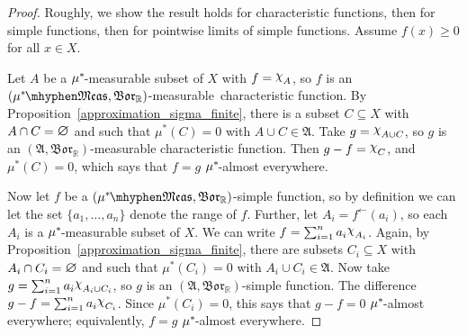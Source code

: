 \documentclass[
twoside=true,
paper=letter,
fontsize=9pt,
pagesize=auto,
leqno,
openany,
headsepline,
overfullrule,
]{scrbook}
\theoremstyle{plain}
\theoremstyle{plain}
\theoremstyle{definition}
\theoremstyle{bfnoteitalic}
\theoremstyle{bfnoteroman}
\newcommand{\sigalg}[1]{\mathfrak{#1}}
\newcommand{\borel}{\mathfrak{Bor}}
\newcommand{\charfunction}[1]{{\raisebox{2pt}{$\chi$}}_{#1}}
\newcommand{\mtset}{\hbox{\large{$\varnothing$}}}
\newcommand{\preimage}[1]{#1^{\leftarrow}}
\newcommand{\R}{\mathbb{R}}
\newcommand{\meets}{\cap}
\newcommand{\sigmaalgebra}{\sigalg{A}}
\newcommand{\measurable}[1]{{#1}\mhyphen\mathfrak{Meas}}
\newcommand{\kernast}{\ast\kern-1pt}
\newcommand{\mbmeasurable}{$(\measurable{\measure^\kernast},\borel_\R)$\hyp{}measurable}
\newcommand{\measurespace}{X}
\newcommand{\measure}{\mu}
\begin{document}
\begin{proof}
Roughly, we show the result holds for characteristic functions, then for simple functions, then for pointwise limits of simple functions. 
Assume $f(x)\geq 0$ for all $x\in\measurespace$.

Let $A$ be a  $\measure^\kernast$-measurable subset of $\measurespace$ with  $f=\charfunction{A}$, so $f$ is an \mbmeasurable\ characteristic function. By Proposition~\ref{approximation_sigma_finite}, there is a subset $C\subseteq\measurespace$ with $A\meets C =\mtset$ and  such that $\measure^*(C) = 0$ with $A\cup C\in \sigmaalgebra$.  
Take $g=\charfunction{A\cup C}$, so $g$ is an $(\sigmaalgebra,\borel_\R)$\hyp{}measurable characteristic function. Then $g-f = \charfunction{C}$, and $\measure^*(C) = 0$, which says that $f=g$ $\measure^\kernast$-almost everywhere.

Now let $f$ be a $(\measurable{\measure^\kernast},\borel_\R)$-simple function, so by definition we can let the set $\{a_1,\ldots, a_n\}$ denote the range of $f$. Further, let $A_i = \preimage{f}(a_i)$, so each $A_i$ is a $\measure^\kernast$-measurable subset of $\measurespace$. We can write $f=\sum_{i=1}^n a_i\charfunction{A_i}$.
Again, by Proposition~\ref{approximation_sigma_finite}, there are subsets $C_i\subseteq\measurespace$ with $A_i\meets C_i =\mtset$ and  such that $\measure^*(C_i) = 0$ with $A_i\cup C_i\in \sigmaalgebra$.  
Now take $g=\sum_{i=1}^n a_i\charfunction{A_i\cup C_i}$, so $g$ is an $(\sigmaalgebra,\borel_\R)$-simple function. The difference $g-f = \sum_{i=1}^n a_i\charfunction{C_i}$. Since $\measure^*(C_i)=0$, this says that $g-f = 0$ $\measure^\kernast$-almost everywhere; equivalently, $f=g$ $\measure^\kernast$-almost everywhere.


\end{proof}
\end{document}
